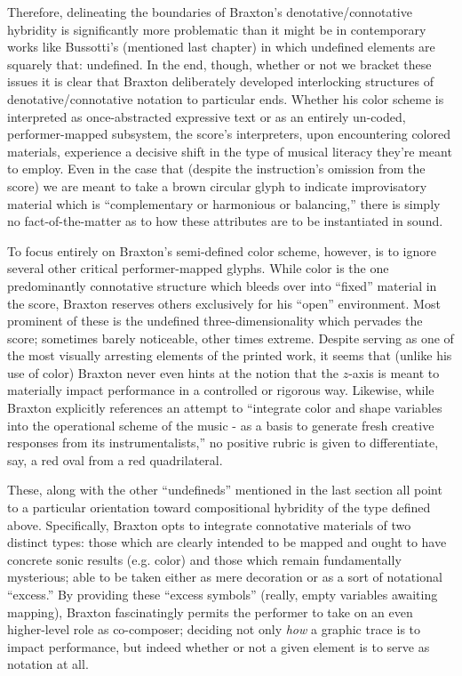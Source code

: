         Therefore, delineating the boundaries of Braxton's denotative/connotative hybridity is significantly more problematic than it might be in contemporary works like Bussotti's (mentioned last chapter) in which undefined elements are squarely that: undefined. In the end, though, whether or not we bracket these issues it is clear that Braxton deliberately developed interlocking structures of denotative/connotative notation to particular ends. Whether his color scheme is interpreted as once-abstracted expressive text or as an entirely un-coded, performer-mapped subsystem, the score's interpreters, upon encountering colored materials, experience a decisive shift in the type of musical literacy they're meant to employ. Even in the case that (despite the instruction's omission from the score) we are meant to take a brown circular glyph to indicate improvisatory material which is ``complementary or harmonious or balancing,'' there is simply no fact-of-the-matter as to how these attributes are to be instantiated in sound. 

        To focus entirely on Braxton's semi-defined color scheme, however, is to ignore several other critical performer-mapped glyphs. While color is the one predominantly connotative structure which bleeds over into ``fixed'' material in the score, Braxton reserves others exclusively for his ``open'' environment. Most prominent of these is the undefined three-dimensionality which pervades the score; sometimes barely noticeable, other times extreme. Despite serving as one of the most visually arresting elements of the printed work, it seems that (unlike his use of color) Braxton never even hints at the notion that the $z$-axis is meant to materially impact performance in a controlled or rigorous way. Likewise, while Braxton explicitly references an attempt to ``integrate color and shape variables into the operational scheme of the music - as a basis to generate fresh creative responses from its instrumentalists,'' no positive rubric is given to differentiate, say, a red oval from a red quadrilateral.\autocite[143]{Braxton_1988}

        These, along with the other ``undefineds'' mentioned in the last section all point to a particular orientation toward compositional hybridity of the type defined above. Specifically, Braxton opts to integrate connotative materials of two distinct types: those which are clearly intended to be mapped and ought to have concrete sonic results (e.g. color) and those which remain fundamentally mysterious; able to be taken either as mere decoration or as a sort of notational ``excess.'' By providing these ``excess symbols'' (really, empty variables awaiting mapping), Braxton fascinatingly permits the performer to take on an even higher-level role as co-composer; deciding not only \textit{how} a graphic trace is to impact performance, but indeed whether or not a given element is to serve as notation at all.
        
